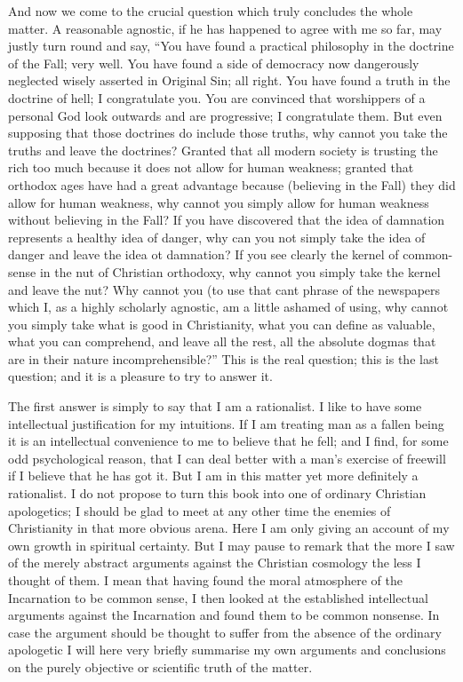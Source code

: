 \documentclass{book}
\begin{document}
And now we come to the crucial question which truly concludes the whole matter. A reasonable agnostic, if he has happened to agree with me so far, may justly turn round and say, “You have found a practical philosophy in the doctrine of the Fall; very well. You have found a side of democracy now dangerously neglected wisely asserted in Original Sin; all right. You have found a truth in the doctrine of hell; I congratulate you. You are convinced that worshippers of a personal God look outwards and are progressive; I congratulate them. But even supposing that those doctrines do include those truths, why cannot you take the truths and leave the doctrines? Granted that all modern society is trusting the rich too much because it does not allow for human weakness; granted that orthodox ages have had a great advantage because (believing in the Fall) they did allow for human weakness, why cannot you simply allow for human weakness without believing in the Fall? If you have discovered that the idea of damnation represents a healthy idea of danger, why can you not simply take the idea of danger and leave the idea ot damnation? If you see clearly the kernel of common-sense in the nut of Christian orthodoxy, why cannot you simply take the kernel and leave the nut? Why cannot you (to use that cant phrase of the newspapers which I, as a highly scholarly agnostic, am a little ashamed of using, why cannot you simply take what is good in Christianity, what you can define as valuable, what you can comprehend, and leave all the rest, all the absolute dogmas that are in their nature incomprehensible?” This is the real question; this is the last question; and it is a pleasure to try to answer it.

The first answer is simply to say that I am a rationalist. I like to have some intellectual justification for my intuitions. If I am treating man as a fallen being it is an intellectual convenience to me to believe that he fell; and I find, for some odd psychological reason, that I can deal better with a man’s exercise of freewill if I believe that he has got it. But I am in this matter yet more definitely a rationalist. I do not propose to turn this book into one of ordinary Christian apologetics; I should be glad to meet at any other time the enemies of Christianity in that more obvious arena. Here I am only giving an account of my own growth in spiritual certainty. But I may pause to remark that the more I saw of the merely abstract arguments against the Christian cosmology the less I thought of them. I mean that having found the moral atmosphere of the Incarnation to be common sense, I then looked at the established intellectual arguments against the Incarnation and found them to be common nonsense. In case the argument should be thought to suffer from the absence of the ordinary apologetic I will here very briefly summarise my own arguments and conclusions on the purely objective or scientific truth of the matter.
\end{document}
